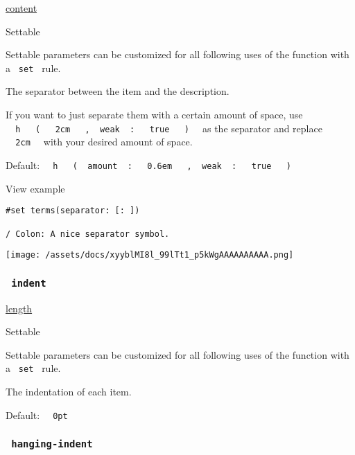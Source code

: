 \href{/docs/reference/foundations/content/}{content}

{{ Settable }}

\label{parameters-separator-settable-tooltip}
Settable parameters can be customized for all following uses of the
function with a \texttt{\ set\ } rule.

The separator between the item and the description.

If you want to just separate them with a certain amount of space, use
\texttt{\ }{\texttt{\ h\ }}\texttt{\ }{\texttt{\ (\ }}\texttt{\ }{\texttt{\ 2cm\ }}\texttt{\ }{\texttt{\ ,\ }}\texttt{\ weak\ }{\texttt{\ :\ }}\texttt{\ }{\texttt{\ true\ }}\texttt{\ }{\texttt{\ )\ }}\texttt{\ }
as the separator and replace \texttt{\ }{\texttt{\ 2cm\ }}\texttt{\ }
with your desired amount of space.

Default:
\texttt{\ }{\texttt{\ h\ }}\texttt{\ }{\texttt{\ (\ }}\texttt{\ amount\ }{\texttt{\ :\ }}\texttt{\ }{\texttt{\ 0.6em\ }}\texttt{\ }{\texttt{\ ,\ }}\texttt{\ weak\ }{\texttt{\ :\ }}\texttt{\ }{\texttt{\ true\ }}\texttt{\ }{\texttt{\ )\ }}\texttt{\ }


View example

\begin{verbatim}
#set terms(separator: [: ])

/ Colon: A nice separator symbol.
\end{verbatim}

\texttt{[image: /assets/docs/xyyblMI8l\_99lTt1\_p5kWgAAAAAAAAAA.png]}

\subsubsection{\texorpdfstring{\texttt{\ indent\ }}{ indent }}\label{parameters-indent}

\href{/docs/reference/layout/length/}{length}

{{ Settable }}

\label{parameters-indent-settable-tooltip}
Settable parameters can be customized for all following uses of the
function with a \texttt{\ set\ } rule.

The indentation of each item.

Default: \texttt{\ }{\texttt{\ 0pt\ }}\texttt{\ }

\subsubsection{\texorpdfstring{\texttt{\ hanging-indent\ }}{ hanging-indent }}\label{parameters-hanging-indent}

